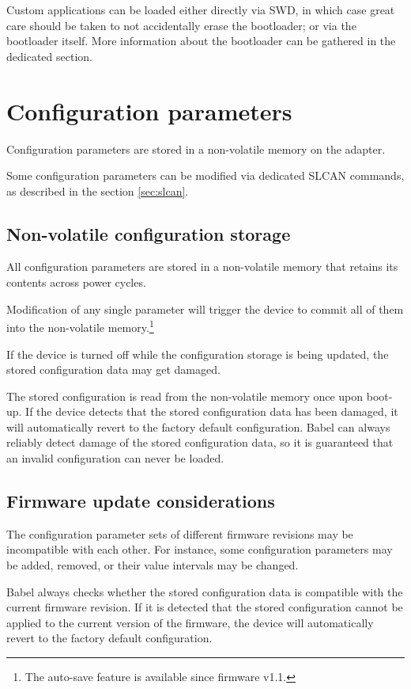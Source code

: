 \documentclass{zubaxdoc}
\begin{document}
Custom applications can be loaded either directly via SWD, in which case great care should be taken to not accidentally erase the bootloader; or via the bootloader itself. More information about the bootloader can be gathered in the dedicated section.

\chapter{Configuration parameters}\label{sec:configuration_parameters}

Configuration parameters are stored in a non-volatile memory on the adapter.

Some configuration parameters can be modified via dedicated SLCAN commands,
as described in the section \ref{sec:slcan}.

\section{Non-volatile configuration storage}

All configuration parameters are stored in a non-volatile memory
that retains its contents across power cycles.

Modification of any single parameter will trigger the device to commit all of them into the non-volatile
memory.\footnote{The auto-save feature is available since firmware v1.1.}

If the device is turned off while the configuration storage is being updated,
the stored configuration data may get damaged.

The stored configuration is read from the non-volatile memory once upon boot-up.
If the device detects that the stored configuration data has been damaged,
it will automatically revert to the factory default configuration.
Babel can always reliably detect damage of the stored configuration data,
so it is guaranteed that an invalid configuration can never be loaded.

\section{Firmware update considerations}

The configuration parameter sets of different firmware revisions may be incompatible with each other.
For instance, some configuration parameters may be added, removed, or their value intervals may be changed.

Babel always checks whether the stored configuration data is compatible with the current
firmware revision.
If it is detected that the stored configuration cannot be applied to the current version of the firmware,
the device will automatically revert to the factory default configuration.
\end{document}

